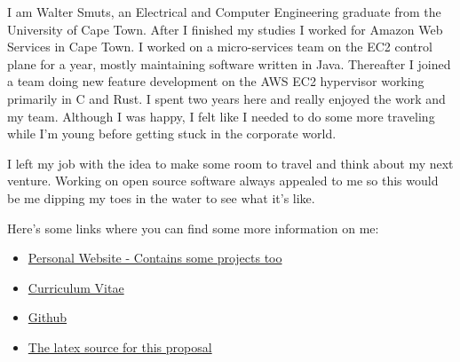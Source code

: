 I am Walter Smuts, an Electrical and Computer Engineering graduate from the
University of Cape Town. After I finished my studies I worked for Amazon Web
Services in Cape Town. I worked on a micro-services team on the EC2 control plane
for a year, mostly maintaining software written in Java. Thereafter I joined a
team doing new feature development on the AWS EC2 hypervisor working primarily in
C and Rust. I spent two years here and really enjoyed the work and my team.
Although I  was happy, I felt like I needed to do some more traveling while I'm
young before getting stuck in the corporate world.

I left my job with the idea to make some room to travel and think about my next
venture. Working on open source software always appealed to me so this would be me
dipping my toes in the water to see what it's like.

Here's some links where you can find some more information on me:
\begin{itemize}
\item \href{https://www.waltersmuts.com}{Personal Website - Contains some projects too}
\item \href{https://www.waltersmuts.com/Walter\%20Smuts\%20-\%20Curriculum\%20Vitae.pdf}{Curriculum Vitae}
\item \href{https://github.com/WalterSmuts}{Github}
\item \href{https://github.com/WalterSmuts/2022-summer-of-code-proposals}{The latex source for this proposal}
\end{itemize}
